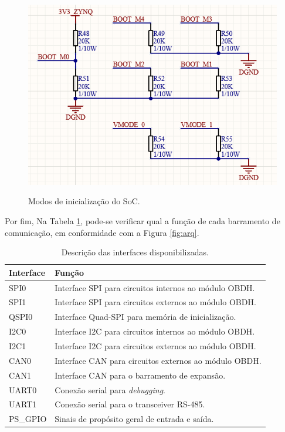 \begin{figure}[H]
    \centering
    \caption{Modos de inicialização do SoC.}
    \includegraphics[scale=0.8]{images/bootmode.png}
    \label{fig:boot}
\end{figure}

Por fim, Na Tabela \ref{tab:interfaces}, pode-se verificar qual a função de cada barramento de comunicação, em conformidade com a Figura \ref{fig:arq}. 

\begin{table}[H]
	\ABNTEXfontereduzida
	\caption{\label{tab:interfaces}Descrição das interfaces disponibilizadas.}
    \centering
    \begin{tabular}{@{} >{\centering}p{4cm} >{\centering}p{8cm} @{}}
    
		\toprule
		\textbf{Interface} & \textbf{Função} \tabularnewline 
        \midrule
         SPI0 & Interface SPI para circuitos internos ao módulo OBDH. \tabularnewline
        \midrule
         SPI1 & Interface SPI para circuitos externos ao módulo OBDH.  \tabularnewline
        \midrule
         QSPI0 & Interface Quad-SPI para memória de inicialização. \tabularnewline
        \midrule
        I2C0  & Interface I2C para circuitos internos ao módulo OBDH. \tabularnewline
        \midrule
        I2C1  & Interface I2C para circuitos externos ao módulo OBDH.  \tabularnewline
        \midrule
        CAN0 & Interface CAN para circuitos externos ao módulo OBDH. \tabularnewline
        \midrule
        CAN1 & Interface CAN para o barramento de expansão. \tabularnewline
        \midrule
         UART0 & Conexão serial para \textit{debugging}. \tabularnewline
        \midrule
         UART1 & Conexão serial para o transceiver RS-485. \tabularnewline
        \midrule
         PS\_GPIO & Sinais de propósito geral de entrada e saída. \tabularnewline

        \bottomrule
	\end{tabular}
\end{table}

